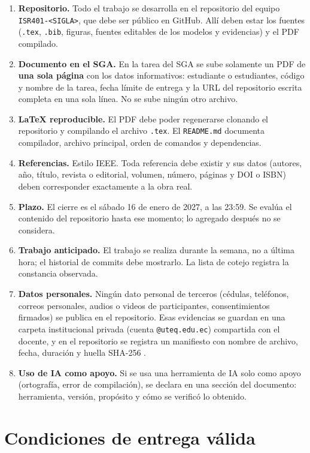 \documentclass[11pt]{article}
\newcommand{\seccion}[1]{\section{\textcolor{utegreendk}{#1}}}
\begin{document}
\begin{enumerate}[leftmargin=20pt,itemsep=3pt]
	\item \textbf{Repositorio.} Todo el trabajo se desarrolla en el repositorio del equipo \texttt{ISR401-<SIGLA>}, que debe ser público en GitHub. Allí deben estar los fuentes (\texttt{.tex}, \texttt{.bib}, figuras, fuentes editables de los modelos y evidencias) y el PDF compilado.
	\item \textbf{Documento en el SGA.} En la tarea del SGA se sube solamente un PDF de \textbf{una sola página} con los datos informativos: estudiante o estudiantes, código y nombre de la tarea, fecha límite de entrega y la URL del repositorio escrita completa en una sola línea. No se sube ningún otro archivo.
	\item \textbf{\LaTeX{} reproducible.} El PDF debe poder regenerarse clonando el repositorio y compilando el archivo \texttt{.tex}. El \texttt{README.md} documenta compilador, archivo principal, orden de comandos y dependencias.
	\item \textbf{Referencias.} Estilo IEEE. Toda referencia debe existir y sus datos (autores, año, título, revista o editorial, volumen, número, páginas y DOI o ISBN) deben corresponder exactamente a la obra real.
	\item \textbf{Plazo.} El cierre es el sábado 16 de enero de 2027, a las 23:59. Se evalúa el contenido del repositorio hasta ese momento; lo agregado después no se considera.
	\item \textbf{Trabajo anticipado.} El trabajo se realiza durante la semana, no a última hora; el historial de commits debe mostrarlo. La lista de cotejo registra la constancia observada.
	\item \textbf{Datos personales.} Ningún dato personal de terceros (cédulas, teléfonos, correos personales, audios o videos de participantes, consentimientos firmados) se publica en el repositorio. Esas evidencias se guardan en una carpeta institucional privada (cuenta \texttt{@uteq.edu.ec}) compartida con el docente, y en el repositorio se registra un manifiesto con nombre de archivo, fecha, duración y huella SHA-256 \citep{lopdp_2021}.
	\item \textbf{Uso de IA como apoyo.} Si se usa una herramienta de IA solo como apoyo (ortografía, error de compilación), se declara en una sección del documento: herramienta, versión, propósito y cómo se verificó lo obtenido.
\end{enumerate}

\seccion{Condiciones de entrega válida}
\end{document}
